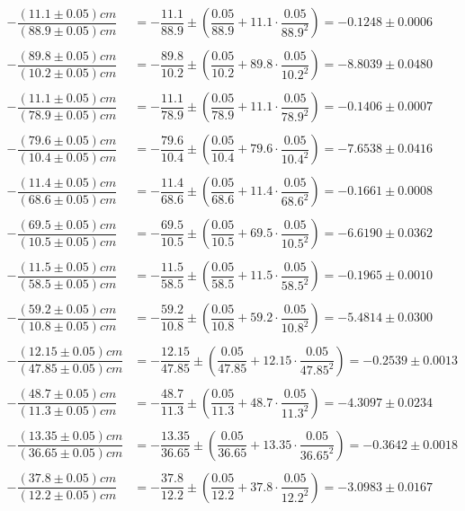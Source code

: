 \documentclass[a4paper, 10pt]{article}
\begin{document}
	\begin{align*}
		-\dfrac{(11.1\pm 0.05)cm}{(88.9\pm 0.05)cm}&=-\dfrac{11.1}{88.9}\pm\left(\dfrac{0.05}{88.9}+11.1\cdot\dfrac{0.05}{88.9^2}\right)=-0.1248\pm0.0006\\\\
		-\dfrac{(89.8\pm 0.05)cm}{(10.2\pm 0.05)cm}&=-\dfrac{89.8}{10.2}\pm\left(\dfrac{0.05}{10.2}+89.8\cdot\dfrac{0.05}{10.2^2}\right)=-8.8039\pm0.0480\\\\
		-\dfrac{(11.1\pm 0.05)cm}{(78.9\pm 0.05)cm}&=-\dfrac{11.1}{78.9}\pm\left(\dfrac{0.05}{78.9}+11.1\cdot\dfrac{0.05}{78.9^2}\right)=-0.1406\pm0.0007\\\\
		-\dfrac{(79.6\pm 0.05)cm}{(10.4\pm 0.05)cm}&=-\dfrac{79.6}{10.4}\pm\left(\dfrac{0.05}{10.4}+79.6\cdot\dfrac{0.05}{10.4^2}\right)=-7.6538\pm0.0416\\\\
		-\dfrac{(11.4\pm 0.05)cm}{(68.6\pm 0.05)cm}&=-\dfrac{11.4}{68.6}\pm\left(\dfrac{0.05}{68.6}+11.4\cdot\dfrac{0.05}{68.6^2}\right)=-0.1661\pm0.0008\\\\
		-\dfrac{(69.5\pm 0.05)cm}{(10.5\pm 0.05)cm}&=-\dfrac{69.5}{10.5}\pm\left(\dfrac{0.05}{10.5}+69.5\cdot\dfrac{0.05}{10.5^2}\right)=-6.6190\pm0.0362\\\\
		-\dfrac{(11.5\pm 0.05)cm}{(58.5\pm 0.05)cm}&=-\dfrac{11.5}{58.5}\pm\left(\dfrac{0.05}{58.5}+11.5\cdot\dfrac{0.05}{58.5^2}\right)=-0.1965\pm0.0010\\\\
		-\dfrac{(59.2\pm 0.05)cm}{(10.8\pm 0.05)cm}&=-\dfrac{59.2}{10.8}\pm\left(\dfrac{0.05}{10.8}+59.2\cdot\dfrac{0.05}{10.8^2}\right)=-5.4814\pm0.0300\\\\
		-\dfrac{(12.15\pm 0.05)cm}{(47.85\pm 0.05)cm}&=-\dfrac{12.15}{47.85}\pm\left(\dfrac{0.05}{47.85}+12.15\cdot\dfrac{0.05}{47.85^2}\right)=-0.2539\pm0.0013\\\\
		-\dfrac{(48.7\pm 0.05)cm}{(11.3\pm 0.05)cm}&=-\dfrac{48.7}{11.3}\pm\left(\dfrac{0.05}{11.3}+48.7\cdot\dfrac{0.05}{11.3^2}\right)=-4.3097\pm 0.0234\\\\
		-\dfrac{(13.35\pm 0.05)cm}{(36.65\pm 0.05)cm}&=-\dfrac{13.35}{36.65}\pm\left(\dfrac{0.05}{36.65}+13.35\cdot\dfrac{0.05}{36.65^2}\right)=-0.3642\pm0.0018\\\\
		-\dfrac{(37.8\pm 0.05)cm}{(12.2\pm 0.05)cm}&=-\dfrac{37.8}{12.2}\pm\left(\dfrac{0.05}{12.2}+37.8\cdot\dfrac{0.05}{12.2^2}\right)=-3.0983\pm0.0167\\\\
	\end{align*}
\end{document}
